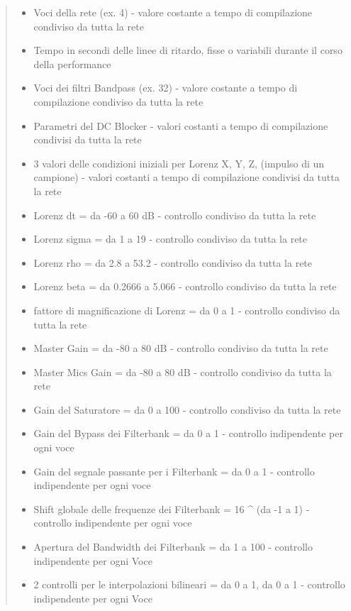 \begin{quote}
    \begin{itemize}
      \item Voci della rete (ex. 4) - valore costante a tempo di compilazione condiviso da tutta la rete
      \item Tempo in secondi delle linee di ritardo, fisse o variabili durante il corso della performance
      \item Voci dei filtri Bandpass (ex. 32) - valore costante a tempo di compilazione condiviso da tutta la rete
      \item Parametri del DC Blocker - valori costanti a tempo di compilazione condivisi da tutta la rete
      \item 3 valori delle condizioni iniziali per Lorenz X, Y, Z, (impulso di un campione) - valori costanti a tempo di compilazione condivisi da tutta la rete
      \item Lorenz dt = da -60 a 60 dB - controllo condiviso da tutta la rete
      \item Lorenz sigma = da 1 a 19 - controllo condiviso da tutta la rete
      \item Lorenz rho = da 2.8 a 53.2 - controllo condiviso da tutta la rete
      \item Lorenz beta = da 0.2666 a 5.066 - controllo condiviso da tutta la rete
      \item fattore di magnificazione di Lorenz = da 0 a 1 - controllo condiviso da tutta la rete
      \item Master Gain = da -80 a 80 dB - controllo condiviso da tutta la rete
      \item Master Mics Gain = da -80 a 80 dB - controllo condiviso da tutta la rete
      \item Gain del Saturatore = da 0 a 100 - controllo condiviso da tutta la rete
      \item Gain del Bypass dei Filterbank = da 0 a 1 - controllo indipendente per ogni voce
      \item Gain del segnale passante per i Filterbank = da 0 a 1 - controllo indipendente per ogni voce
      \item Shift globale delle frequenze dei Filterbank = 16 ^ (da -1 a 1) - controllo indipendente per ogni voce
      \item Apertura del Bandwidth dei Filterbank = da 1 a 100 - controllo indipendente per ogni Voce
      \item 2 controlli per le interpolazioni bilineari  = da 0 a 1, da 0 a 1 - controllo indipendente per ogni Voce
    \end{itemize}
\end{quote}

